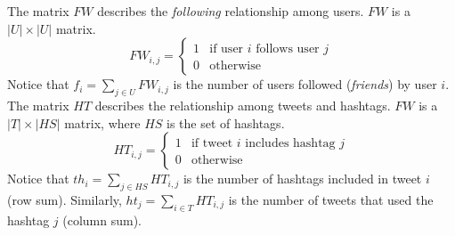 The matrix $FW$ describes the \emph{following} relationship among users. $FW$ is a $|U| \times |U|$ matrix.
\begin{equation}\label{eq:following_rel}
FW_{i,j} = \begin{cases}
1 & \text{if user } i \text{ follows user } j \\
0 & \text{otherwise}
\end{cases}
\end{equation}
Notice that $f_i = \sum_{j \in U} FW_{i,j}$ is the number of users followed (\emph{friends}) by user $i$. \\

The matrix $HT$ describes the relationship among tweets and hashtags. $FW$ is a $|T| \times |HS|$ matrix, where $HS$ is the set of hashtags.
\begin{equation}\label{eq:hashtags_rel}
HT_{i,j} = \begin{cases}
1 & \text{if tweet } i \text{ includes hashtag } j \\
0 & \text{otherwise}
\end{cases}
\end{equation}
Notice that $th_i = \sum_{j \in HS} HT_{i,j}$ is the number of hashtags included in tweet $i$ (row sum). Similarly, $ht_j = \sum_{i \in T} HT_{i,j}$ is the number of tweets that used the hashtag $j$ (column sum).